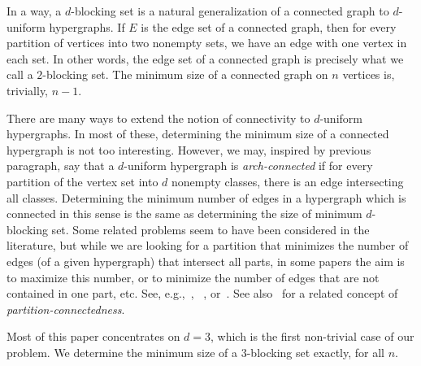 \documentclass[11pt,a4paper]{article}
\begin{document}
In a way, a $d$-blocking set is a natural generalization of a connected graph to $d$-uniform hypergraphs. If $E$ is the edge set of a connected graph, then for every partition of vertices into two nonempty sets, we have an edge with one vertex in each set. In other words, the edge set of a connected graph is precisely what we call a $2$-blocking set. The minimum size of a connected graph on $n$ vertices is, trivially, $n-1$.

There are many ways to extend the notion of connectivity to $d$-uniform hypergraphs. In most of these, determining the minimum size of a connected hypergraph is not too interesting. However, we may, inspired by previous paragraph, say that a $d$-uniform  hypergraph is {\em arch-connected} if for every partition of the vertex set into $d$ nonempty classes, there is an edge intersecting all classes. Determining the minimum number of edges in a hypergraph which is connected in this sense is the same as determining the size of minimum $d$-blocking set. Some related problems seem to have been considered in the literature, but while we are looking for a partition that minimizes the number of edges (of a given hypergraph) that intersect all parts, in some papers the aim is to maximize this number, or to minimize the number of edges that are not contained in one part, etc. See, e.g.,~\cite{Conlon_Fox_Kwan_Sudakov}, ~\cite{Bollobas_Scott}, or~\cite{Papa_Markov}. See also~\cite{pttn_connected} for a related concept of {\em partition-connectedness}.



Most of this paper concentrates on $d=3$, which is the first non-trivial case of our problem. We determine the minimum size of a $3$-blocking set exactly, for all $n$.
\end{document}
